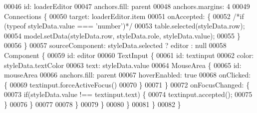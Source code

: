 \begin{DoxyCode}
00046             \textcolor{keywordtype}{id}: loaderEditor
00047             anchors.fill: parent
00048             anchors.margins: 4
00049             Connections \{
00050                 target: loaderEditor.item
00051                 onAccepted: \{
00052                     \textcolor{comment}{/*if (typeof styleData.value === 'number')*/}
00053                     table.selected(styleData.row);
00054                     model.setData(styleData.row, styleData.role, styleData.value);
00055                 \}
00056             \}
00057             sourceComponent: styleData.selected ? editor : null
00058             Component \{
00059                 \textcolor{keywordtype}{id}: editor
00060                 TextInput \{
00061                     \textcolor{keywordtype}{id}: textinput
00062                     color: styleData.textColor
00063                     text: styleData.value
00064                     MouseArea \{
00065                         \textcolor{keywordtype}{id}: mouseArea
00066                         anchors.fill: parent
00067                         hoverEnabled: \textcolor{keyword}{true}
00068                         onClicked: \{
00069                             textinput.forceActiveFocus()
00070                         \}
00071                     \}
00072                     onFocusChanged: \{
00073                         \textcolor{keywordflow}{if}(styleData.value !== textinput.text) \{
00074                             textinput.accepted();
00075                         \}
00076                     \}
00077 
00078                 \}
00079             \}
00080         \}
00081     \}
00082 \}
\end{DoxyCode}
